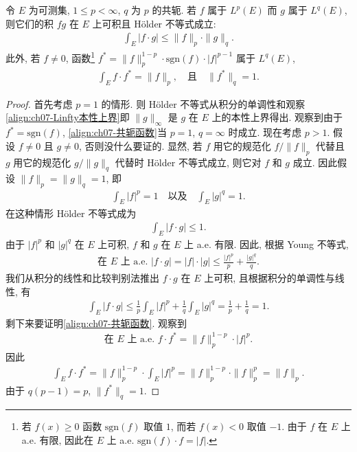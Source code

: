 \documentclass[../../main.tex]{subfiles}
\begin{document}
\begin{theorem}\label{theorem:ch07-Holder}
令 $E$ 为可测集, $1\leqslant p<\infty$, $q$ 为 $p$ 的共轭. 若 $f$ 属于 $L^{p}(E)$ 而 $g$ 属于 $L^{q}(E)$, 则它们的积 $fg$ 在 $E$ 上可积且 H\"older 不等式成立:
\begin{align}
\int_{E}|f\cdot g|\leqslant\|f\|_{p}\cdot\|g\|_{q}.\label{align:ch07-Holder}
\end{align}
此外, 若 $f\neq 0$, 函数\footnote{若 $f(x)\geqslant 0$ 函数 $\mathrm{sgn}(f)$ 取值 $1$, 而若 $f(x)<0$ 取值 $-1$. 由于 $f$ 在 $E$ 上 a.e. 有限, 因此在 $E$ 上 a.e. $\mathrm{sgn}(f)\cdot f=|f|$.} $f^{*}=\|f\|_{p}^{1-p}\cdot\mathrm{sgn}(f)\cdot|f|^{p-1}$ 属于 $L^{q}(E)$,
\begin{align}
\int_{E}f\cdot f^{*}=\|f\|_{p},\quad\text{且}\quad\|f^{*}\|_{q}=1.\label{align:ch07-共轭函数}
\end{align}
\end{theorem}

\begin{proof}
首先考虑 $p=1$ 的情形. 则 H\"older 不等式从积分的单调性和观察\eqref{align:ch07-Linfty本性上界}即 $\|g\|_{\infty}$ 是 $g$ 在 $E$ 上的本性上界得出. 观察到由于 $f^{*}=\mathrm{sgn}(f)$, \eqref{align:ch07-共轭函数}当 $p=1$, $q=\infty$ 时成立. 现在考虑 $p>1$. 假设 $f\neq 0$ 且 $g\neq 0$, 否则没什么要证的. 显然, 若 $f$ 用它的规范化 $f/\|f\|_{p}$ 代替且 $g$ 用它的规范化 $g/\|g\|_{q}$ 代替时 H\"older 不等式成立, 则它对 $f$ 和 $g$ 成立. 因此假设 $\|f\|_{p}=\|g\|_{q}=1$, 即
\begin{align*}
\int_{E}|f|^{p}=1\quad\text{以及}\quad\int_{E}|g|^{q}=1.
\end{align*}
在这种情形 H\"older 不等式成为
\begin{align*}
\int_{E}|f\cdot g|\leqslant 1.
\end{align*}
由于 $|f|^{p}$ 和 $|g|^{q}$ 在 $E$ 上可积, $f$ 和 $g$ 在 $E$ 上 a.e. 有限. 因此, 根据 Young 不等式,
\begin{align*}
\text{在 }E\text{ 上 a.e. }|f\cdot g|=|f|\cdot|g|\leqslant\frac{|f|^{p}}{p}+\frac{|g|^{q}}{q}.
\end{align*}
我们从积分的线性和比较判别法推出 $f\cdot g$ 在 $E$ 上可积, 且根据积分的单调性与线性, 有
\begin{align*}
\int_{E}|f\cdot g|\leqslant\frac{1}{p}\int_{E}|f|^{p}+\frac{1}{q}\int_{E}|g|^{q}=\frac{1}{p}+\frac{1}{q}=1.
\end{align*}
剩下来要证明\eqref{align:ch07-共轭函数}. 观察到
\begin{align*}
\text{在 }E\text{ 上 a.e. }f\cdot f^{*}=\|f\|_{p}^{1-p}\cdot|f|^{p}.
\end{align*}
因此
\begin{align*}
\int_{E}f\cdot f^{*}=\|f\|_{p}^{1-p}\cdot\int_{E}|f|^{p}=\|f\|_{p}^{1-p}\cdot\|f\|_{p}^{p}=\|f\|_{p}.
\end{align*}
由于 $q(p-1)=p$, $\|f^{*}\|_{q}=1$.
\end{proof}
\end{document}
